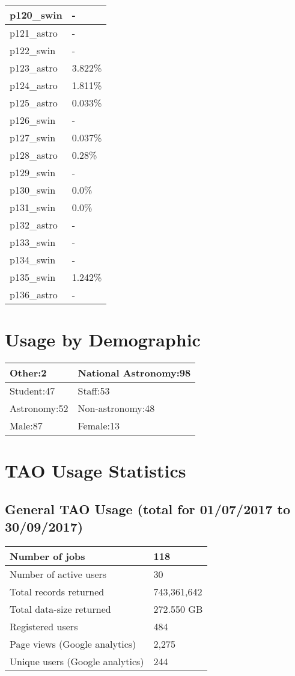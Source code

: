 \documentclass{article}%
\begin{document}
\begin{longtabu}{X[l] X[r]}
\hline%
p120\_swin&{-}\\%
\hline%
p121\_astro&{-}\\%
\hline%
p122\_swin&{-}\\%
\hline%
p123\_astro&3.822\%\\%
\hline%
p124\_astro&1.811\%\\%
\hline%
p125\_astro&0.033\%\\%
\hline%
p126\_swin&{-}\\%
\hline%
p127\_swin&0.037\%\\%
\hline%
p128\_astro&0.28\%\\%
\hline%
p129\_swin&{-}\\%
\hline%
p130\_swin&0.0\%\\%
\hline%
p131\_swin&0.0\%\\%
\hline%
p132\_astro&{-}\\%
\hline%
p133\_swin&{-}\\%
\hline%
p134\_swin&{-}\\%
\hline%
p135\_swin&1.242\%\\%
\hline%
p136\_astro&{-}\\%
\hline%
\end{longtabu}%
\section{Usage by Demographic}%

%
\begin{longtabu}{X[l] X[l]}%
Other:2&National Astronomy:98\\%
\hline%
Student:47&Staff:53\\%
\hline%
Astronomy:52&Non{-}astronomy:48\\%
\hline%
Male:87&Female:13\\%
\hline%
\end{longtabu}%
\newpage%
\section{TAO Usage Statistics}%

%
\subsection{General TAO Usage (total for 01/07/2017 to 30/09/2017)}%

%
\begin{longtabu}{X[l] X[l]}%
Number of jobs&118\\%
\hline%
Number of active users&30\\%
\hline%
Total records returned&743,361,642\\%
\hline%
Total data{-}size returned&272.550 GB\\%
\hline%
Registered users&484\\%
\hline%
Page views (Google analytics)&2,275\\%
\hline%
Unique users (Google analytics)&244\\%
\hline%
\end{longtabu}%
\end{document}
